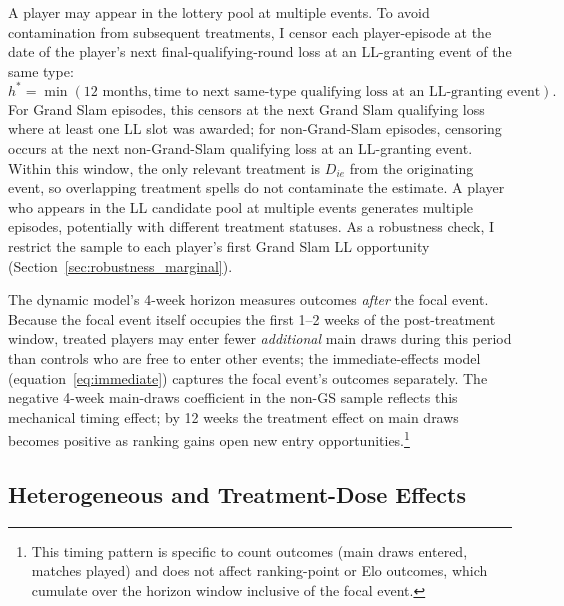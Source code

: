 A player may appear in the lottery pool at multiple events. To avoid contamination from subsequent treatments, I censor each player-episode at the date of the player's next final-qualifying-round loss at an LL-granting event of the same type:
\[
h^{*} = \min(12\text{ months}, \text{time to next same-type qualifying loss at an LL-granting event}).
\]
For Grand Slam episodes, this censors at the next Grand Slam qualifying loss where at least one LL slot was awarded; for non-Grand-Slam episodes, censoring occurs at the next non-Grand-Slam qualifying loss at an LL-granting event. Within this window, the only relevant treatment is $D_{ie}$ from the originating event, so overlapping treatment spells do not contaminate the estimate. A player who appears in the LL candidate pool at multiple events generates multiple episodes, potentially with different treatment statuses. As a robustness check, I restrict the sample to each player's first Grand Slam LL opportunity (Section~\ref{sec:robustness_marginal}).

The dynamic model's 4-week horizon measures outcomes \textit{after} the focal event. Because the focal event itself occupies the first 1--2 weeks of the post-treatment window, treated players may enter fewer \textit{additional} main draws during this period than controls who are free to enter other events; the immediate-effects model (equation~\ref{eq:immediate}) captures the focal event's outcomes separately. The negative 4-week main-draws coefficient in the non-GS sample reflects this mechanical timing effect; by 12 weeks the treatment effect on main draws becomes positive as ranking gains open new entry opportunities.\footnote{This timing pattern is specific to count outcomes (main draws entered, matches played) and does not affect ranking-point or Elo outcomes, which cumulate over the horizon window inclusive of the focal event.}

\subsection{Heterogeneous and Treatment-Dose Effects}
\label{sec:strategy_heterogeneity}

